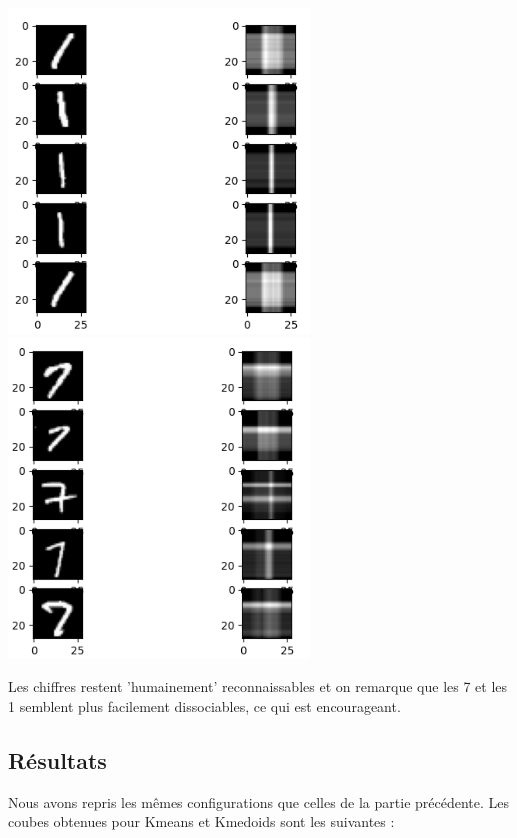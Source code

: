 \documentclass{article}
\begin{document}
\begin{center}
    \includegraphics[width=0.6\textwidth]{./Images/spe_pre_pro_1.png}
    \includegraphics[width=0.6\textwidth]{./Images/spe_pre_pro_7.png}
\end{center}
Les chiffres restent 'humainement' reconnaissables et on remarque que les 7 et les 1 semblent plus facilement dissociables, ce qui est encourageant.

\subsection{Résultats}

Nous avons repris les mêmes configurations que celles de la partie précédente.
Les coubes obtenues pour Kmeans et Kmedoids sont les suivantes :
\end{document}
